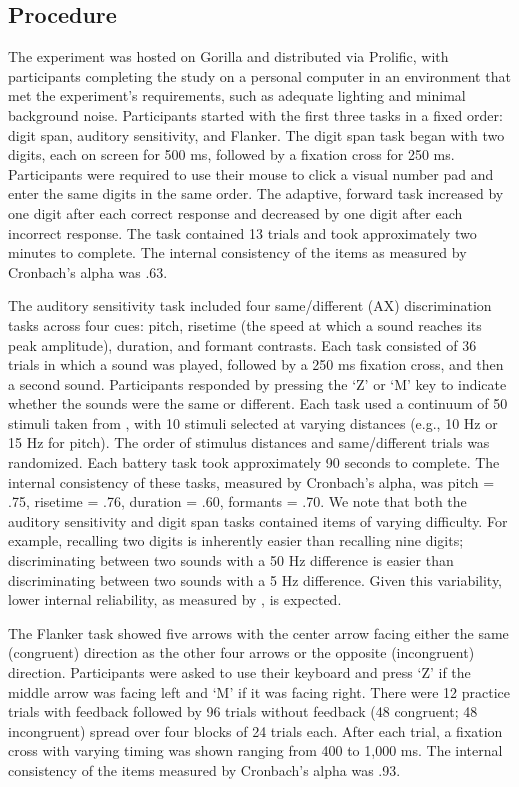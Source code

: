 \subsection{Procedure}

The experiment was hosted on Gorilla \parencite{Anwyl-Irvine_2019} and distributed via Prolific, with participants completing the study on a personal computer in an environment that met the experiment’s requirements, such as adequate lighting and minimal background noise. Participants started with the first three tasks in a fixed order: digit span, auditory sensitivity, and Flanker. The digit span task began with two digits, each on screen for 500 ms, followed by a fixation cross for 250 ms. Participants were required to use their mouse to click a visual number pad and enter the same digits in the same order. The adaptive, forward task increased by one digit after each correct response and decreased by one digit after each incorrect response. The task contained 13 trials and took approximately two minutes to complete. The internal consistency of the items as measured by Cronbach's alpha was .63. 

The auditory sensitivity task included four same/different (AX) discrimination tasks across four cues:  pitch, risetime (the speed at which a sound reaches its peak amplitude), duration, and formant contrasts. Each task consisted of 36 trials in which a sound was played, followed by a 250 ms fixation cross, and then a second sound. Participants responded by pressing the ‘Z’ or ‘M’ key to indicate whether the sounds were the same or different. Each task used a continuum of 50 stimuli taken from \textcite{Kachlicka_Saito_Tierney_2019}, with 10 stimuli selected at varying distances (e.g., 10 Hz or 15 Hz for pitch). The order of stimulus distances and same/different trials was randomized. Each battery task took approximately 90 seconds to complete. The internal consistency of these tasks, measured by Cronbach’s alpha, was pitch = .75, risetime = .76, duration = .60, formants = .70. We note that both the auditory sensitivity and digit span tasks contained items of varying difficulty. For example, recalling two digits is inherently easier than recalling nine digits; discriminating between two sounds with a 50 Hz difference is easier than discriminating between two sounds with a 5 Hz difference. Given this variability, lower internal reliability, as measured by \textcite{Cronbach1951}, is expected. 

The Flanker task showed five arrows with the center arrow facing either the same (congruent) direction as the other four arrows or the opposite (incongruent) direction. Participants were asked to use their keyboard and press ‘Z’ if the middle arrow was facing left and ‘M’ if it was facing right. There were 12 practice trials with feedback followed by 96 trials without feedback (48 congruent; 48 incongruent) spread over four blocks of 24 trials each. After each trial, a fixation cross with varying timing was shown ranging from 400 to 1,000 ms. The internal consistency of the items measured by Cronbach’s alpha was .93.

